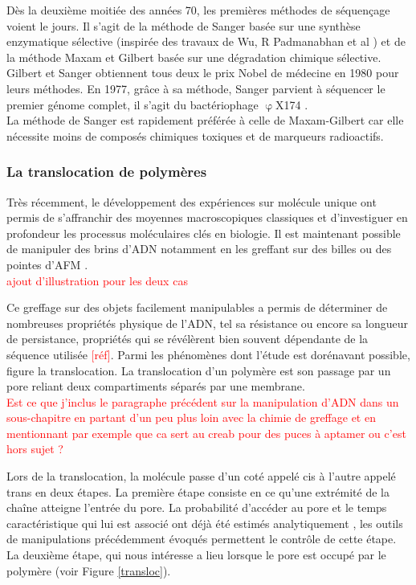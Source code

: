 \documentclass[a4paper,11pt]{article}
\begin{document}
 Dès la deuxième moitiée des années 70, les premières méthodes de séquençage voient le jours. Il s'agit de la méthode de Sanger \cite{Sanger1975} basée sur une synthèse enzymatique sélective (inspirée des travaux de Wu, R Padmanabhan et al \cite{WU1972}) et de la méthode Maxam et Gilbert \cite{Maxam1977} basée sur une dégradation chimique sélective. Gilbert et Sanger obtiennent tous deux le prix Nobel de médecine en 1980 pour leurs méthodes. En 1977, grâce à sa méthode, Sanger parvient à séquencer le premier génome complet, il s'agit du bactériophage $\upvarphi$X174 \cite{Sanger1977}.\\
 
 La méthode de Sanger est rapidement préférée à celle de Maxam-Gilbert car elle nécessite moins de composés chimiques toxiques et de marqueurs radioactifs.


 
 
\subsubsection{La translocation de polymères}



Très récemment, le développement des expériences sur molécule unique ont permis de s'affranchir des moyennes macroscopiques classiques et d'investiguer en profondeur les processus moléculaires clés en biologie. Il est maintenant possible de manipuler des brins d'ADN notamment en les greffant sur des billes ou des pointes d'AFM \cite{keyser}.\\

\textcolor{red}{ajout d'illustration pour les deux cas}

Ce greffage sur des objets facilement manipulables a permis de déterminer de nombreuses propriétés physique de l'ADN, tel sa résistance ou encore sa longueur de persistance, propriétés qui se révélèrent bien souvent dépendante de la séquence utilisée \textcolor{red}{[réf]}. Parmi les phénomènes dont l'étude est dorénavant possible, figure la translocation. La translocation d'un polymère est son passage par un pore reliant deux compartiments séparés par une membrane.\\

\textcolor{red}{Est ce que j'inclus le paragraphe précédent sur la manipulation d'ADN dans un sous-chapitre en partant d'un peu plus loin avec la chimie de greffage et en mentionnant par exemple que ca sert au creab pour des puces à aptamer ou c'est hors sujet ?}

 Lors de la translocation, la molécule passe d'un coté appelé cis à l'autre appelé trans en deux étapes. La première étape consiste en ce qu'une extrémité de la chaîne atteigne l'entrée du pore. La probabilité d'accéder au pore et le temps caractéristique qui lui est associé ont déjà été estimés analytiquement \cite{milchev}, les outils de manipulations précédemment évoqués permettent le contr\^{o}le  de cette étape. La deuxième étape, qui nous intéresse a lieu lorsque le pore est occupé par le polymère (voir Figure \ref{transloc}). \\
\end{document}
